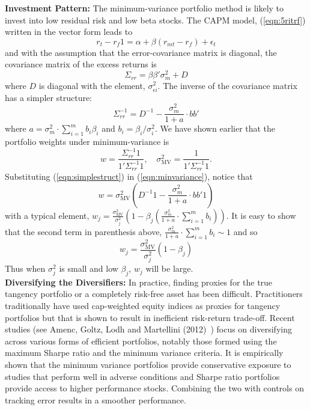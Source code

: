 \noindent \textbf{Investment Pattern:} The minimum-variance portfolio method is likely to invest into low residual risk and low beta stocks. The CAPM model, (\ref{eqn:5ritrf}) written in the vector form leads to
	\begin{equation}\label{eqn:vectorform}
	r_t - r_f 1 = \alpha + \beta(r_{mt} - r_f) + \epsilon_t
	\end{equation}
and with the assumption that the error-covariance matrix is diagonal, the covariance matrix of the excess returns is
	\begin{equation}\label{eqn:Sigmarr}
	\Sigma_{rr}= \beta\beta' \sigma_m^2 + D
	\end{equation}	
where $D$ is diagonal with the element, $\sigma_{\epsilon i}^2$. The inverse of the covariance matrix has a simpler structure:
	\begin{equation}\label{eqn:simplestruct}
	\Sigma_{rr}^{-1}= D^{-1} - \dfrac{\sigma_m^2}{1+a} \cdot bb'
	\end{equation}	
where $a=\sigma_m^2 \cdot \sum_{i=1}^m b_i \beta_i$ and $b_i= \beta_i/\sigma_i^2$. We have shown earlier that the portfolio weights under minimum-variance is
	\begin{equation} \label{eqn:minvariance}
	w= \dfrac{\Sigma_{rr}^{-1} 1}{1' \Sigma_{rr}^{-1} 1}, \quad \sigma_{\text{MV}}^2= \dfrac{1}{1' \Sigma_{rr}^{-1} 1}.
	\end{equation}	
Substituting (\ref{eqn:simplestruct}) in (\ref{eqn:minvariance}), notice that 
	\begin{equation}\label{eqn:wsubtitute}
	w= \sigma_{\text{MV}}^2 \left( D^{-1} 1 - \dfrac{\sigma_m^2}{1+a} \cdot bb' 1\right)
	\end{equation}
with a typical element, $w_j= \frac{\sigma_{\text{MV}}^2}{\sigma_j^2} \left(1 - \beta_j \left(\frac{\sigma_m^2}{1+a} \cdot \sum_{i=1}^m b_i \right)\right)$. It is easy to show that the second term in parenthesis above, $\frac{\sigma_m^2}{1+a} \cdot \sum_{i=1}^m b_i \sim 1$ and so
	\begin{equation}\label{eqn:wsubsecond}
	w_j= \dfrac{\sigma_{\text{MV}}^2}{\sigma_j^2} ( 1- \beta_j)
	\end{equation}
Thus when $\sigma_j^2$ is small and low $\beta_j$, $w_j$ will be large. \\


\noindent\textbf{Diversifying the Diversifiers:} In practice, finding proxies for the true tangency portfolio or a completely risk-free asset has been difficult. Practitioners traditionally have used cap-weighted equity indices as proxies for tangency portfolios but that is shown to result in inefficient risk-return trade-off. Recent studies (see Amenc, Goltz, Lodh and Martellini (2012)~\cite{amencgoltzlodhmart}) focus on diversifying across various forms of efficient portfolios, notably those formed using the maximum Sharpe ratio and the minimum variance criteria. It is empirically shown that the minimum variance portfolios provide conservative exposure to studies that perform well in adverse conditions and Sharpe ratio portfolios provide access to higher performance stocks. Combining the two with controls on tracking error results in a smoother performance. 


